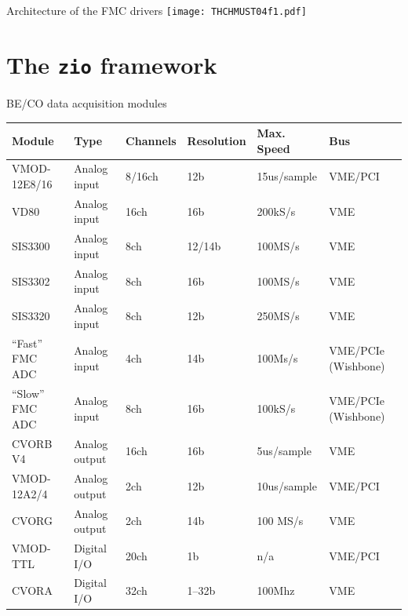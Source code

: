 \documentclass{beamer}
\begin{document}
\begin{frame}{Architecture of the FMC drivers}
\texttt{[image: THCHMUST04f1.pdf]}
\end{frame}

\section{The \texttt{zio} framework}

\begin{frame}{BE/CO data acquisition modules}
   \begin{tiny}
   \begin{tabular}{llllll}
       \toprule
	\textbf{Module}& \textbf{Type}& \textbf{Channels}&
	\textbf{Resolution}& \textbf{Max. Speed}& \textbf{Bus} \\
       \midrule
	VMOD-12E8/16    &  Analog input  & 8/16ch & 12b    & 15us/sample & VME/PCI  \\
	VD80            &  Analog input  & 16ch   & 16b    & 200kS/s     & VME  \\
	SIS3300         &  Analog input  & 8ch    & 12/14b & 100MS/s     & VME  \\
	SIS3302         &  Analog input  & 8ch    & 16b    & 100MS/s     & VME  \\
	SIS3320         &  Analog input  & 8ch    & 12b    & 250MS/s     & VME  \\
	``Fast'' FMC ADC&  Analog input  & 4ch    & 14b    & 100Ms/s     & VME/PCIe (Wishbone)  \\
	``Slow'' FMC ADC&  Analog input  & 8ch    & 16b    & 100kS/s     & VME/PCIe (Wishbone)  \\
       \midrule
	CVORB V4        &  Analog output & 16ch   &  16b   &  5us/sample & VME 	 \\
	VMOD-12A2/4     &  Analog output & 2ch    &  12b   &  10us/sample& VME/PCI \\
	CVORG           &  Analog output & 2ch    &  14b   &  100 MS/s   & VME  \\
       \midrule
	VMOD-TTL        &  Digital I/O   & 20ch   & 1b     & n/a         & VME/PCI \\
	CVORA           &  Digital I/O   & 32ch   & 1--32b & 100Mhz	 & VME \\
       \bottomrule
   \end{tabular}
   \end{tiny}
\end{frame}
\end{document}

